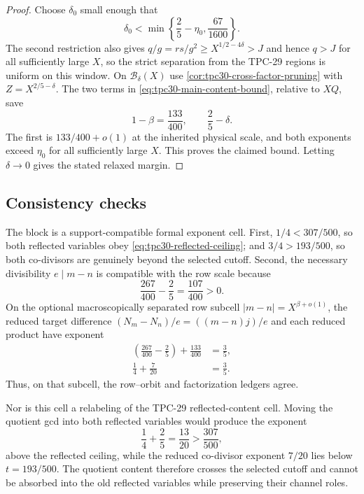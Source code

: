 \begin{proof}
Choose $\delta_0$ small enough that
\begin{equation}
 \delta_0<\min\left\{\frac25-\eta_0,\frac{67}{1600}\right\}.
 \label{eq:tpc30-high-delta-choice}
\end{equation}
The second restriction also gives
$q/g=rs/g^2\ge X^{1/2-4\delta}>J$ and hence $q>J$ for all sufficiently
large $X$, so the strict separation from the TPC-29 regions is uniform
on this window.
On $\mathscr B_\delta(X)$ use
\cref{cor:tpc30-cross-factor-pruning} with
$Z=X^{2/5-\delta}$.  The two terms in
\eqref{eq:tpc30-main-content-bound}, relative to $XQ$, save
\begin{equation}
 1-\beta=\frac{133}{400},
 \qquad
 \frac25-\delta.
 \label{eq:tpc30-high-two-savings}
\end{equation}
The first is $133/400+o(1)$ at the inherited physical scale, and both
exponents exceed $\eta_0$ for all sufficiently large $X$.  This proves
the claimed bound.  Letting $\delta\to0$ gives the stated relaxed
margin.
\end{proof}

\subsection{Consistency checks}

The block is a support-compatible formal exponent cell.  First,
$1/4<307/500$, so both reflected variables obey
\eqref{eq:tpc30-reflected-ceiling}; and
$3/4>193/500$, so both co-divisors are genuinely beyond the selected
cutoff.  Second, the necessary divisibility $e\mid m-n$ is compatible
with the row scale because
\begin{equation}
 \frac{267}{400}-\frac25
 =\boxed{\frac{107}{400}}>0.
 \label{eq:tpc30-high-row-content-gap}
\end{equation}
On the optional macroscopically separated row subcell
$|m-n|=X^{\beta+o(1)}$, the reduced target difference
$(N_m-N_n)/e=((m-n)j)/e$ and each reduced product have exponent
\begin{align}
 \left(\frac{267}{400}-\frac25\right)
 +\frac{133}{400}
 &=\frac35,
 \label{eq:tpc30-high-row-orbit-balance}\\
 \frac14+\frac7{20}
 &=\frac35.
 \label{eq:tpc30-high-factor-balance}
\end{align}
Thus, on that subcell, the row--orbit and factorization ledgers agree.

Nor is this cell a relabeling of the TPC-29 reflected-content cell.
Moving the quotient gcd into both reflected variables would produce
the exponent
\begin{equation}
 \frac14+\frac25=\frac{13}{20}
 >\frac{307}{500},
 \label{eq:tpc30-high-not-reflected}
\end{equation}
above the reflected ceiling, while the reduced co-divisor exponent
$7/20$ lies below $t=193/500$.  The quotient content therefore crosses
the selected cutoff and cannot be absorbed into the old reflected
variables while preserving their channel roles.

